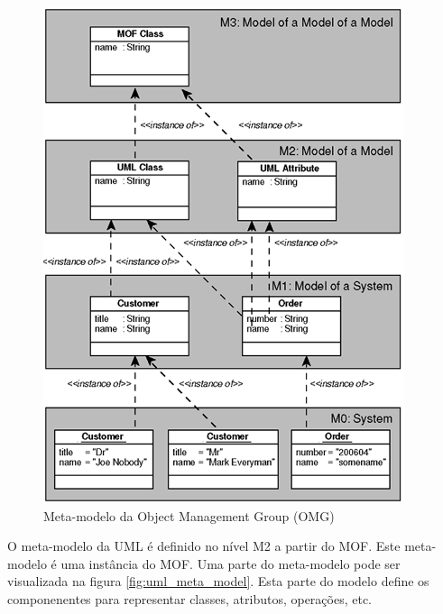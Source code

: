 \begin{figure}
	\centering
	\includegraphics{img/omg_meta_model.png}
	\caption{Meta-modelo da Object Management Group (OMG)}\label{fig:omg_meta_model}
\end{figure}

O meta-modelo da UML é definido no nível M2 a partir do MOF. Este meta-modelo é uma instância do MOF. Uma parte do meta-modelo pode ser visualizada na
figura \ref{fig:uml_meta_model}. Esta parte do modelo define os componenentes para representar classes, atributos, operações, etc.

